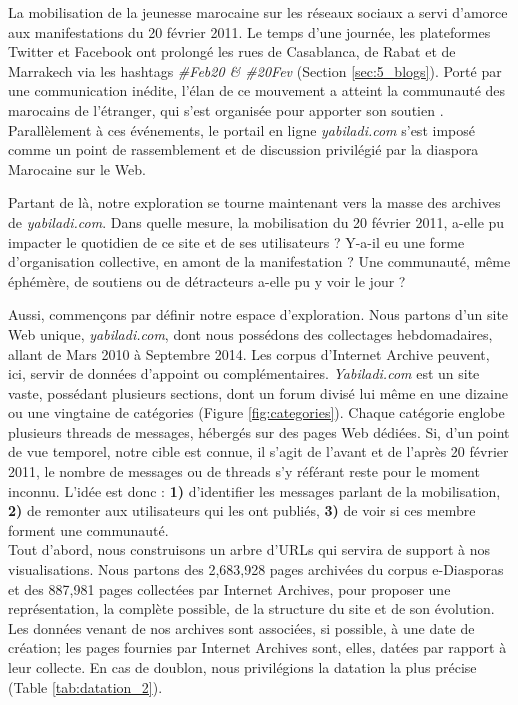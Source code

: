 \documentclass[symmetric,justified,marginals=raggedouter]{tufte-book}
\begin{document}
\noindent La mobilisation de la jeunesse marocaine sur les réseaux sociaux a servi d'amorce aux manifestations du 20 février 2011. Le temps d'une journée, les plateformes Twitter et Facebook ont prolongé les rues de Casablanca, de Rabat et de Marrakech via les hashtags \textit{\#Feb20 \& \#20Fev} (Section \ref{sec:5_blogs}). Porté par une communication inédite, l'élan de ce mouvement a atteint la communauté des marocains de l'étranger, qui s'est orga\-nisée pour apporter son soutien \citep{desrues_mouvement_2012}. Parallèlement à ces événements, le portail en ligne \textit{yabiladi.com} s'est imposé comme un point de rassemblement et de discussion privilégié par la diaspora Marocaine sur le Web. 

Partant de là, notre exploration se tourne maintenant vers la masse des archives de \textit{yabiladi.com}. Dans quelle mesure, la mobilisation du 20 février 2011, a-elle pu impacter le quotidien de ce site et de ses utilisateurs ? Y-a-il eu une forme d'organisation collective, en amont de la manifestation ? Une communauté, même éphémère, de soutiens ou de détracteurs a-elle pu y voir le jour ?

Aussi, commençons par définir notre espace d'exploration. Nous partons d'un site Web unique, \textit{yabiladi.com}, dont nous possédons des collectages hebdomadaires, allant de Mars 2010 à Septembre 2014. Les corpus d'Internet Archive peuvent, ici, servir de données d'appoint ou complémentaires. \textit{Yabiladi.com} est un site vaste, possédant plusieurs sections, dont un forum divisé lui même en une dizaine ou une vingtaine de catégories (Figure \ref{fig:categories}). Chaque catégorie englobe plusieurs threads de messages, hébergés sur des pages Web dédiées. Si, d'un point de vue temporel, notre cible est connue, il s'agit de l'avant et de l'après 20 février 2011, le nombre de messages ou de threads s'y référant reste pour le moment inconnu. L'idée est donc : \textbf{1)} d'identifier les messages parlant de la mobilisation, \textbf{2)} de remonter aux utilisateurs qui les ont publiés, \textbf{3)} de voir si ces membre forment une communauté. \\   

\noindent Tout d'abord, nous construisons un arbre d'URLs qui servira de support à nos visualisations. Nous partons des 2,683,928 pages archivées du corpus e-Diasporas et des 887,981 pages collectées par Internet Archives, pour proposer une représentation, la complète possible, de la structure du site et de son évolution. Les données venant de nos archives sont associées, si possible, à une date de création; les pages fournies par Internet Archives sont, elles, datées par rapport à leur collecte. En cas de doublon, nous privilégions la datation la plus précise (Table \ref{tab:datation_2}).
\end{document}
